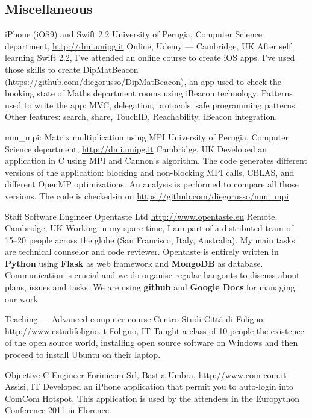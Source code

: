 \documentclass[10pt,a4paper,sans]{moderncv}
\begin{document}
\subsection{Miscellaneous}
    {iPhone (iOS9) and Swift 2.2}
    {University of Perugia, Computer Science department,
        \url{http://dmi.unipg.it}}
    {Online, Udemy --- Cambridge, UK}{}
    {After self learning Swift 2.2, I've attended an online course to create
    iOS apps. I've used those skills to create DipMatBeacon
    (\url{https://github.com/diegorusso/DipMatBeacon}), an app used to check
    the booking state of Maths department rooms using iBeacon technology.
    Patterns used to write the app: MVC, delegation, protocols,
    safe programming patterns. Other features: search, share, TouchID,
    Reachability, iBeacon integration.}

    {mm\_mpi: Matrix multiplication using MPI}
    {University of Perugia, Computer Science department,
        \url{http://dmi.unipg.it}}
    {Cambridge, UK}{}
    {Developed an application in C using MPI and Cannon's algorithm. The code
    generates different versions of the application: blocking and non-blocking
    MPI calls, CBLAS, and different OpenMP optimizations. An analysis is
    performed to compare all those versions. The code is checked-in on
    \url{https://github.com/diegorusso/mm\_mpi}}

    {Staff Software Engineer}
    {Opentaste Ltd \url{http://www.opentaste.eu}}
    {Remote, Cambridge, UK}{}
    {Working in my spare time, I am part of a distributed team of 15--20 people
    across the globe (San Francisco, Italy, Australia). My main tasks are
    technical counselor and code reviewer. Opentaste is entirely written in
    \textbf{Python} using \textbf{Flask} as web framework and \textbf{MongoDB}
    as database. Communication is crucial and we do organise regular hangouts
    to discuss about plans, issues and tasks. We are using \textbf{github} and
    \textbf{Google Docs} for managing our work }

    {Teaching --- Advanced computer course}
    {Centro Studi Citt\'a di Foligno, \url{http://www.cstudifoligno.it}}
    {Foligno, IT}{}
    {Taught a class of 10 people the existence of the open source world,
    installing open source software on Windows and then proceed to install
    Ubuntu on their laptop.}

    {Objective-C Engineer}
    {Forinicom Srl, Bastia Umbra, \url{http://www.com-com.it}}
    {Assisi, IT}{}
    {Developed an iPhone application that permit you to auto-login into ComCom
    Hotspot. This application is used by the attendees in the Europython
    Conference 2011 in Florence.}
\end{document}
